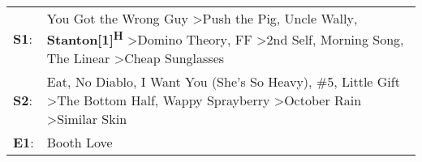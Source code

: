 \begin{supertabular}{p{0.03\textwidth}p{0.92\textwidth}}
 \textbf{S1}:  &  You Got the Wrong Guy\textsuperscript{} \textgreater \enspace Push the Pig\textsuperscript{}, \enspace Uncle Wally\textsuperscript{}, \enspace \textbf{Stanton[1]\textsuperscript{H}} \textgreater \enspace Domino Theory\textsuperscript{}, \enspace FF\textsuperscript{} \textgreater \enspace 2nd Self\textsuperscript{}, \enspace Morning Song\textsuperscript{}, \enspace The Linear\textsuperscript{} \textgreater \enspace Cheap Sunglasses\textsuperscript{}  \enspace  \\
 \textbf{S2}:  &                                                            Eat\textsuperscript{}, \enspace No Diablo\textsuperscript{}, \enspace I Want You (She's So Heavy)\textsuperscript{}, \enspace \#5\textsuperscript{}, \enspace Little Gift\textsuperscript{} \textgreater \enspace The Bottom Half\textsuperscript{}, \enspace Wappy Sprayberry\textsuperscript{} \textgreater \enspace October Rain\textsuperscript{} \textgreater \enspace Similar Skin\textsuperscript{}  \enspace  \\
 \textbf{E1}:  &                                                                                                                                                                                                                                                                                                                                                                                                                                          Booth Love\textsuperscript{}  \enspace  \\
\end{supertabular}
